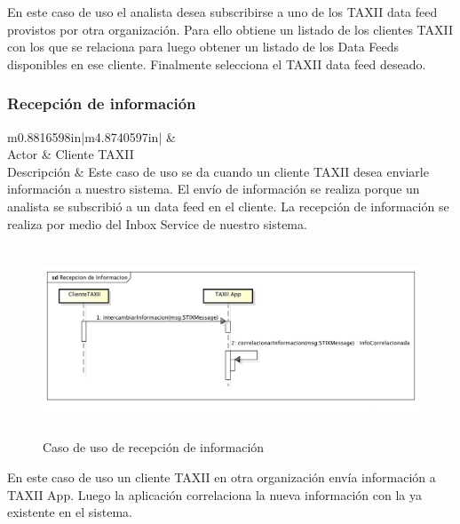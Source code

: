 	En este caso de uso el analista desea subscribirse a uno de los TAXII data feed provistos por otra organización. Para
	ello obtiene un listado de los clientes TAXII con los que se relaciona para luego obtener un listado de los Data Feeds
	disponibles en ese cliente. Finalmente selecciona el TAXII data feed deseado.

\newpage
\subsubsection{Recepción de información}
\begin{flushleft}
	\tablefirsthead{}
	\tablehead{}
	\tabletail{}
	\tablelasttail{}
	\begin{supertabular}{m{0.8816598in}|m{4.8740597in}|}
		 &
		\\\hline
		{Actor} &
		{Cliente TAXII}\\
		{Descripción} &
		{Este caso de uso se da cuando un cliente TAXII desea enviarle información a
			nuestro sistema. El envío de información se realiza porque un analista se subscribió a un data feed en el cliente. La
			recepción de información se realiza por medio del Inbox Service de nuestro sistema.}\\\hhline{~-}
	\end{supertabular}
\end{flushleft}
\begin{figure}[ht!]
	\centering
	\includegraphics[width=5.7638in,height=2.2256in]{Analisis22-img/Analisis22-img028.png} 
	\caption{Caso de uso de recepción de información}
	\label{fig.recepcioninfo}
\end{figure}

	En este caso de uso un cliente TAXII en otra organización envía información a TAXII App. Luego la aplicación
	correlaciona la nueva información con la ya existente en el sistema.
\newpage
